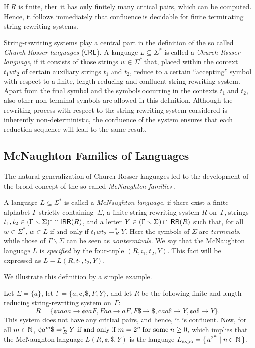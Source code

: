 If $R$ is finite, then it has only finitely many critical pairs, which can be computed. Hence, it follows immediately that confluence is decidable for finite terminating string-rewriting systems.

String-rewriting systems play a central part in the definition of the so called \emph{Church-Rosser languages} (\index{$\CRL$}$\CRL$). A language $L \subseteq \Sigma^*$ is called a \emph{Church-Rosser language}, if it consists of those strings $w \in \Sigma^*$ that, placed within the context $t_1 w t_2$ of certain auxiliary strings $t_1$ and $t_2$, reduce to a certain ``accepting'' symbol with respect to a finite, length-reducing and confluent string-rewriting system. Apart from the final symbol and the symbols occurring in the contexts $t_1$ and $t_2$, also other non-terminal symbols are allowed in this definition. Although the rewriting process with respect to the string-rewriting system considered is inherently non-deterministic, the confluence of the system ensures that each reduction sequence will lead to the same result.

\subsection{McNaughton Families of Languages}
\label{subsection:mcnaughton-families}

The natural generalization of Church-Rosser languages led to the development of the broad concept of the so-called \emph{McNaughton families} \citep{Beaudry2003}.

A language $L\subseteq \Sigma^*$ is called a \emph{McNaughton language}, if there exist a finite alphabet $\Gamma$ strictly containing~$\Sigma$, a finite string-rewriting system $R$ on~$\Gamma$, strings $t_1,t_2\in(\Gamma\smallsetminus\Sigma)^*\cap \textup{\sf IRR}(R)$, and a letter $Y\in(\Gamma\smallsetminus\Sigma)\cap \textup{\sf IRR}(R)$ such that, for all $w\in\Sigma^*$, $w\in L$ if and only if $t_1wt_2\Rightarrow^*_R Y$. Here the symbols of $\Sigma$ are \emph{terminals}, while those of $\Gamma\smallsetminus\Sigma$ can be seen as \emph{nonterminals}. We say that the McNaughton language $L$ is \emph{specified} by the four-tuple $(R,t_1,t_2,Y)$. This fact will be expressed as $L = L(R,t_1,t_2,Y)$.

We illustrate this definition by a simple example.

\begin{example}\label{ExMcNL}
Let $\Sigma=\{a\}$, let $\Gamma=\{a,\cent,\$,F,Y\}$, and let $R$ be the following finite and length-reducing string-rewriting system on~$\Gamma$:
$$R=\{\cent aaaa\to \cent aaF, Faa\to aF, F\$\to \$, \cent aa\$ \to Y, \cent a\$\to Y\}.$$
This system does not have any critical pairs, and hence, it is confluent. Now, for all $m\in \mathbb{N}$, $\cent a^m\$\Rightarrow_R^* Y\textup{ if and only if } m=2^n\textup{ for some }n\ge 0,$ which implies that the McNaughton language $L(R,\cent,\$,Y)$ is the language $L_{\rm expo} = \{\,a^{2^n}\mid n\in \mathbb{N}\,\}.$
\end{example}

